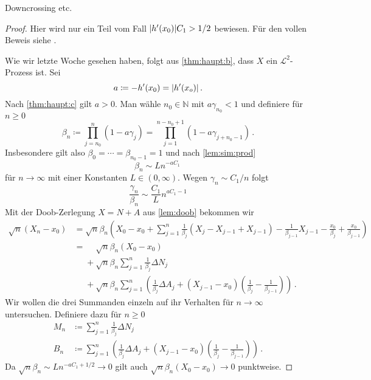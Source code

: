 \documentclass[ngerman,a4paper,11pt]{scrartcl}
\newcommand{\NN}{\mathbb{N}}
\renewcommand{\ll}{\mathcal{L}}
\DeclarePairedDelimiter{\abs}{\lvert}{\rvert}		%
\begin{document}
\begin{rem}
  Downcrossing etc.
\end{rem}
\begin{proof}
  Hier wird nur ein Teil vom Fall $\abs{h'(x_0)}C_1>1/2$ bewiesen. Für
  den vollen Beweis siehe \cite[Satz~11.4]{lpw}.
  
Wie wir letzte Woche gesehen haben, folgt aus \cref{thm:haupt:b}, dass $X$ ein
$\ll^2$-Prozess ist. Sei
\begin{equation*}
 a\coloneqq -h'(x_0)=\abs{h'(x_o)}\,. 
\end{equation*}
Nach \ref{thm:haupt:c} gilt $a>0$. Man wähle $n_0\in\NN$ mit $a\gamma_{n_0}<1$ und
definiere für $n\geq 0$
\begin{equation*}
 \beta_n\coloneqq\prod_{j=n_0}^n(1-a\gamma_j) =\prod_{j=1}^{n-n_0+1}(1-a\gamma_{j+n_0-1})\,.
\end{equation*}
Insbesondere gilt also $\beta_0=\dotsb=\beta_{n_0-1}=1$ und nach \cref{lem:sim:prod}
\begin{equation}\label{eq:beta}
 \beta_n\sim Ln^{-aC_1}\,
\end{equation}
für $n\to\infty$ mit einer Konstanten $L\in(0,\infty)$. Wegen $\gamma_n\sim
C_1/n$ folgt
\begin{equation}
  \frac{\gamma_n}{\beta_n}\sim\frac{C_1}{L}n^{aC_1-1}\label{eq:gammabeta}
\end{equation}
Mit der Doob-Zerlegung $X=N+A$ aus \cref{lem:doob} bekommen wir
\begin{align*}
  \sqrt{n}(X_n-x_0)&=\sqrt{n}\beta_n\left(X_0-x_0+\sum_{j=1}^n\frac{1}{\beta_j}(X_j - X_{j-1} + X_{j-1})-\frac{1}{\beta_{j-1}}X_{j-1}-\frac{x_0}{\beta_j}+\frac{x_0}{\beta_{j-1}}\right)\nonumber \\
&=\phantom{+}\sqrt{n}\beta_n(X_0-x_0)\label{eq:1}\\
&\phantom{=}+\sqrt{n}\beta_n\sum_{j=1}^n\frac{1}{\beta_j}\Delta N_j\\
&\phantom{=}+\sqrt{n}\beta_n\sum_{j=1}^n\left(\frac{1}{\beta_j}\Delta A_j+(X_{j-1}-x_0)(\frac{1}{\beta_j}-\frac{1}{\beta_{j-1}})\right)\,. 
\end{align*}
Wir wollen die drei Summanden einzeln auf ihr Verhalten für $n\to\infty$
untersuchen. Definiere dazu für $n\geq 0$
\begin{align*}
 M_n&\coloneqq \sum_{j=1}^n\frac{1}{\beta_j}\Delta N_j\\
B_n&\coloneqq\sum_{j=1}^n\left(\frac{1}{\beta_j}\Delta A_j+(X_{j-1}-x_0)(\frac{1}{\beta_j}-\frac{1}{\beta_{j-1}})\right)\,.
\end{align*}
Da $\sqrt{n}\beta_n\sim Ln^{-aC_1+1/2}\to 0$ gilt auch
$\sqrt{n}\beta_n(X_0-x_0)\to 0$ punktweise.


\end{proof}
\end{document}
